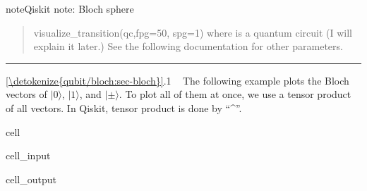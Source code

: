 \documentclass[letterpaper,10pt,english]{jupyterBook}
\begin{document}
\begin{sphinxadmonition}{note}{Qiskit note: Bloch sphere}
\begin{enumerate}
\end{enumerate}
\begin{quote}

\sphinxAtStartPar
visualize\_transition(qc,fpg=50, spg=1)
where  is a quantum circuit (I will explain it later.)   See the following documentation for other parameters.
\end{quote}
\end{sphinxadmonition}


\bigskip\hrule\bigskip


\sphinxAtStartPar
{} \hyperref[\detokenize{qubit/bloch:sec-bloch}]{\ref{\detokenize{qubit/bloch:sec-bloch}}}.1   The following example plots the Bloch vectors of \(|0\rangle\), \(|1\rangle\), and \(|\pm\rangle\).  To plot all of them at once, we use a tensor product of all vectors.  In Qiskit, tensor product is done by “\textasciicircum{}”.

\begin{sphinxuseclass}{cell}\begin{sphinxVerbatimInput}

\begin{sphinxuseclass}{cell_input}
\begin{sphinxVerbatim}[commandchars=\\\{\}]
   

      

\end{sphinxVerbatim}

\end{sphinxuseclass}\end{sphinxVerbatimInput}
\begin{sphinxVerbatimOutput}

\begin{sphinxuseclass}{cell_output}
\noindent{}

\end{sphinxuseclass}\end{sphinxVerbatimOutput}

\end{sphinxuseclass}
\end{document}
